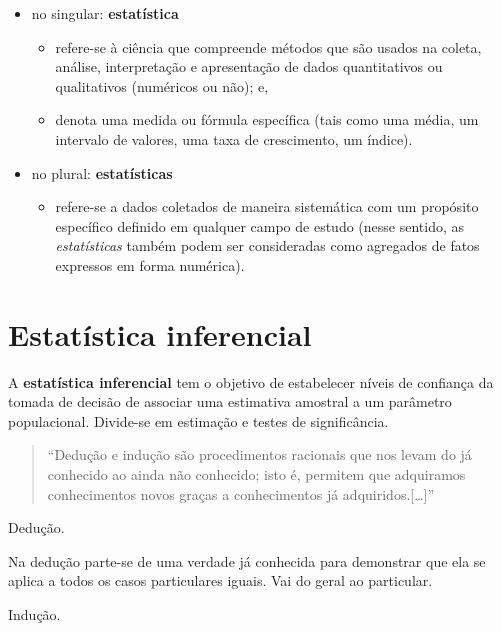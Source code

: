 \documentclass[
]{book}
\providecommand{\tightlist}{%
  \setlength{\itemsep}{0pt}\setlength{\parskip}{0pt}}
\begin{document}
\begin{itemize}
\tightlist
\item
  no singular: \textbf{estatística} \vspace{0.5cm}

  \begin{itemize}
  \tightlist
  \item
    refere-se à ciência que compreende métodos que são usados na coleta, análise, interpretação e apresentação de dados quantitativos ou qualitativos (numéricos ou não); e,
  \item
    denota uma medida ou fórmula específica (tais como uma média, um intervalo de valores, uma taxa de crescimento, um índice).
  \end{itemize}
\item
  no plural: \textbf{estatísticas}

  \begin{itemize}
  \tightlist
  \item
    refere-se a dados coletados de maneira sistemática com um propósito específico definido em qualquer campo de estudo (nesse sentido, as \emph{estatísticas} também podem ser consideradas como agregados de fatos expressos em forma numérica).
  \end{itemize}
\end{itemize}

\hypertarget{estatuxedstica-inferencial}{%
\section{Estatística inferencial}\label{estatuxedstica-inferencial}}

A \textbf{estatística inferencial} tem o objetivo de estabelecer níveis de confiança da tomada de decisão de associar uma estimativa amostral a um parâmetro populacional. Divide-se em estimação e testes de significância.

\begin{quote}
``Dedução e indução são procedimentos racionais que nos levam do já conhecido ao ainda não conhecido; isto é, permitem que adquiramos conhecimentos novos graças a conhecimentos já adquiridos.{[}\ldots{]}''
\end{quote}

Dedução.

Na dedução parte-se de uma verdade já conhecida para demonstrar que ela se aplica a todos os casos particulares iguais. Vai do geral ao particular.

Indução.
\end{document}

